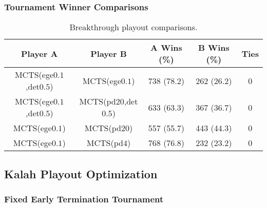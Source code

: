 \documentclass{article}
\begin{document}
\subsubsection{Tournament Winner Comparisons}

%

\begin{table}[h!]
\begin{center}
\begin{tabular}{|c|c|ccc|}
\hline
Player A & Player B                             & A Wins (\%)  & B Wins (\%)  & Ties \\ 
\hline
MCTS(ege$0.1$,det$0.5$) & MCTS(ege$0.1$)        & 738 (78.2)   & 262 (26.2)   & 0    \\
MCTS(ege$0.1$,det$0.5$) & MCTS(pd$20$,det$0.5$) & 633 (63.3)   & 367 (36.7)   & 0    \\
MCTS(ege$0.1$)          & MCTS(pd$20$)          & 557 (55.7)   & 443 (44.3)   & 0    \\
MCTS(ege$0.1$)          & MCTS(pd$4$)           & 768 (76.8)   & 232 (23.2)   & 0    \\
\hline
\end{tabular}
\end{center}
\caption{Breakthrough playout comparisons.}
\end{table}

\subsection{Kalah Playout Optimization}

\subsubsection{Fixed Early Termination Tournament}
\end{document}
